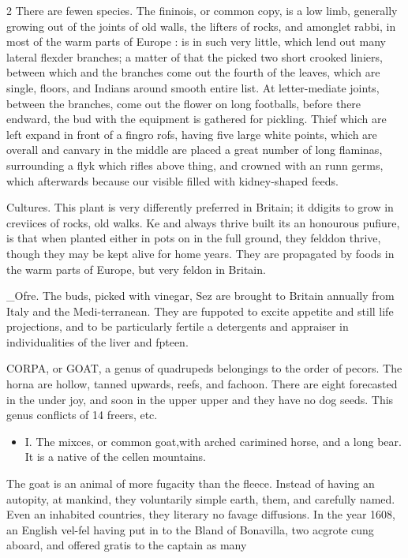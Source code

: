 \documentclass[10pt]{article}
\begin{document}
\begin{multicols}{2}
There are fewen species. The fininois, or common copy, is a low limb, generally growing out of the joints of old walls, the lifters of rocks, and amonglet rabbi, in most of the warm parts of Europe : is in such very little, which lend out many lateral flexder branches; a matter of that the picked two short crooked liniers, between which and the branches come out the fourth of the leaves, which are single, floors, and Indians around smooth entire list. At letter-mediate joints, between the branches, come out the flower on long footballs, before there endward, the bud with the equipment is gathered for pickling. Thief which are left expand in front of a fingro rofs, having five large white points, which are overall and canvary in the middle are placed a great number of long flaminas, surrounding a flyk which rifles above thing, and crowned with an runn germs, which afterwards because our visible filled with kidney-shaped feeds.

Cultures. This plant is very differently preferred in Britain; it ddigits to grow in creviices of rocks, old walks. Ke and always thrive built its an honourous pufiure, is that when planted either in pots on in the full ground, they felddon thrive, though they may be kept alive for home years. They are propagated by foods in the warm parts of Europe, but very feldon in Britain.

\_Ofre. The buds, picked with vinegar, Sez are brought to Britain annually from Italy and the Medi-terranean. They are fuppoted to excite appetite and still life projections, and to be particularly fertile a detergents and appraiser in individualities of the liver and fpteen.

CORPA, or GOAT, a genus of quadrupeds belongings to the order of pecors. The horna are hollow, tanned upwards, reefs, and fachoon. There are eight forecasted in the under joy, and soon in the upper upper and they have no dog seeds. This genus conflicts of 14 freers, etc.

\begin{itemize}\setlength{\itemsep}{1pt}
\item I. The mixces, or common goat,with arched carimined horse, and a long bear. It is a native of the cellen mountains.
\end{itemize}
The goat is an animal of more fugacity than the fleece. Instead of having an autopity, at mankind, they voluntarily simple earth, them, and carefully named. Even an inhabited countries, they literary no favage diffusions. In the year 1608, an English vel-fel having put in to the Bland of Bonavilla, two acgrote cung aboard, and offered gratis to the captain as many

\end{multicols}
\end{document}
